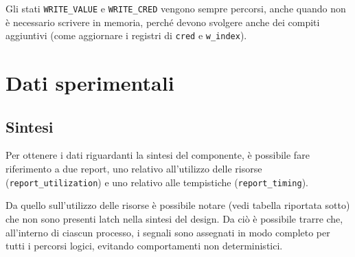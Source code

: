 \documentclass{article}
\begin{document}
Gli stati \texttt{WRITE\_VALUE} e \texttt{WRITE\_CRED} vengono sempre percorsi, anche quando non è necessario scrivere in memoria, perché devono svolgere anche dei compiti aggiuntivi (come aggiornare i registri di \texttt{cred} e \texttt{w\_index}).


\section{Dati sperimentali}

\subsection{Sintesi}

Per ottenere i dati riguardanti la sintesi del componente, è possibile fare riferimento a due report, uno relativo all'utilizzo delle risorse (\texttt{report\_utilization}) e uno relativo alle tempistiche (\texttt{report\_timing}).

Da quello sull'utilizzo delle risorse è possibile notare (vedi tabella  riportata sotto) che non sono presenti latch nella sintesi del design. Da ciò è possibile trarre che, all'interno di ciascun processo, i segnali sono assegnati in modo completo per tutti i percorsi logici, evitando comportamenti non deterministici.
\end{document}
